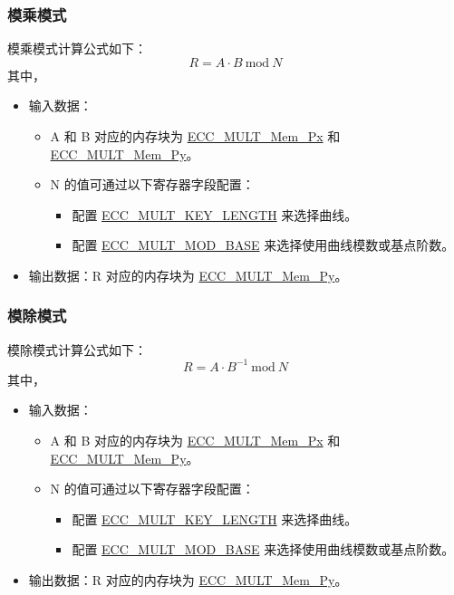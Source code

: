 \documentclass[main\_\_CN.tex]{subfiles}
\begin{document}
\subsubsection{模乘模式}
模乘模式计算公式如下：
\[
R = A \cdot B \ \textrm{mod}\ N
\]
其中，
\begin{itemize}
    \item 输入数据：
    \begin{itemize}
        \item A 和 B 对应的内存块为 \hyperref[tab:ecc-memory]{ECC\_MULT\_Mem\_Px} 和 \hyperref[tab:ecc-memory]{ECC\_MULT\_Mem\_Py}。
        \item N 的值可通过以下寄存器字段配置：
        \begin{itemize}
            \item 配置 \hyperref[fielddesc:ECCMULTKEYLENGTH]{ECC\_MULT\_KEY\_LENGTH} 来选择曲线。
            \item 配置 \hyperref[fielddesc:ECCMULTMODBASE]{ECC\_MULT\_MOD\_BASE} 来选择使用曲线模数或基点阶数。
        \end{itemize}
    \end{itemize}
    \item 输出数据：R 对应的内存块为 \hyperref[tab:ecc-memory]{ECC\_MULT\_Mem\_Py}。
\end{itemize}

\subsubsection{模除模式}
模除模式计算公式如下：
\[
R = A \cdot {B}^{-1} \ \textrm{mod}\ N
\]
其中，
\begin{itemize}
    \item 输入数据：
    \begin{itemize}
        \item A 和 B 对应的内存块为 \hyperref[tab:ecc-memory]{ECC\_MULT\_Mem\_Px} 和 \hyperref[tab:ecc-memory]{ECC\_MULT\_Mem\_Py}。
        \item N 的值可通过以下寄存器字段配置：
        \begin{itemize}
            \item 配置 \hyperref[fielddesc:ECCMULTKEYLENGTH]{ECC\_MULT\_KEY\_LENGTH} 来选择曲线。
            \item 配置 \hyperref[fielddesc:ECCMULTMODBASE]{ECC\_MULT\_MOD\_BASE} 来选择使用曲线模数或基点阶数。
        \end{itemize}
    \end{itemize}
    \item 输出数据：R 对应的内存块为 \hyperref[tab:ecc-memory]{ECC\_MULT\_Mem\_Py}。
\end{itemize}
\end{document}
